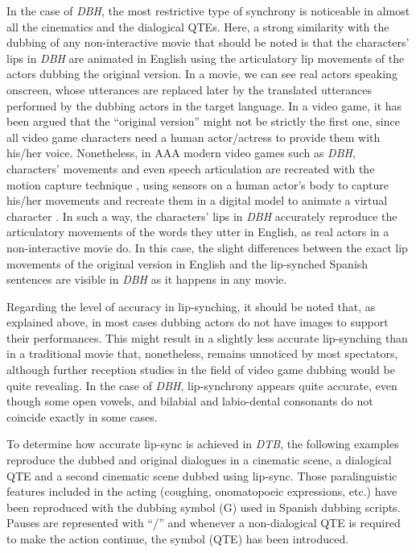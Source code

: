 \documentclass[output=paper]{langsci/langscibook}
\begin{document}
In the case of \textit{DBH}, the most restrictive type of synchrony is noticeable in almost all the cinematics and the dialogical QTEs. Here, a strong similarity with the dubbing of any non-interactive movie that should be noted is that the characters’ lips in \textit{DBH }are animated in English using the articulatory lip movements of the actors dubbing the original version. In a movie, we can see real actors speaking onscreen, whose utterances are replaced later by the translated utterances performed by the dubbing actors in the target language. In a video game, it has been argued \parencite[106]{mendez15} that the \enquote{original version} might not be strictly the first one, since all video game characters need a human actor\slash actress to provide them with his/her voice. Nonetheless, in AAA modern video games such as \textit{DBH}, characters’ movements and even speech articulation are recreated with the motion capture technique \parencite{turnes20}, using sensors on a human actor’s body to capture his/her movements and recreate them in a digital model to animate a virtual character \parencite{kines00}. In such a way, the characters’ lips in \textit{DBH} accurately reproduce the articulatory movements of the words they utter in English, as real actors in a non-interactive movie do. In this case, the slight differences between the exact lip movements of the original version in English and the lip-synched Spanish sentences are visible in \textit{DBH} as it happens in any movie.

Regarding the level of accuracy in lip-synching, it should be noted that, as explained above, in most cases dubbing actors do not have images to support their performances. This might result in a slightly less accurate lip-synching than in a traditional movie that, nonetheless, remains unnoticed by most spectators, although further reception studies in the field of video game dubbing would be quite revealing. In the case of \textit{DBH}, lip-synchrony appears quite accurate, even though some open vowels, and bilabial and labio-dental consonants do not coincide exactly in some cases.

To determine how accurate lip-sync is achieved in \emph{DTB}, the following examples reproduce the dubbed and original dialogues in a cinematic scene, a dialogical QTE and a second cinematic scene dubbed using lip-sync. Those paralinguistic features included in the acting (coughing, onomatopoeic expressions, etc.) have been reproduced with the dubbing symbol (G) used in Spanish dubbing scripts. Pauses are represented with \enquote{/} and whenever a non-dialogical QTE is required to make the action continue, the symbol (QTE) has been introduced.
\end{document}
